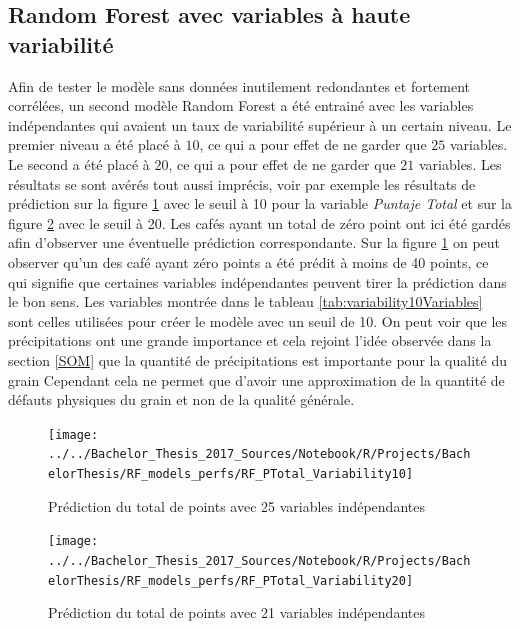 \subsection{Random Forest avec variables à haute variabilité}
Afin de tester le modèle sans données inutilement redondantes et fortement corrélées, un second modèle Random Forest a été entrainé avec les variables indépendantes qui avaient un taux de variabilité supérieur à un certain niveau. Le premier niveau a été placé à $10$, ce qui a pour effet de ne garder que $25$ variables. Le second a été placé à $20$, ce qui a pour effet de ne garder que $21$ variables. Les résultats se sont avérés tout aussi imprécis, voir par exemple les résultats de prédiction sur la figure \ref{fig:rfptotalvariability10} avec le seuil à 10 pour la variable \textit{Puntaje Total} et sur la figure \ref{fig:rfptotalvariability20} avec le seuil à 20. Les cafés ayant un total de zéro point ont ici été gardés afin d'observer une éventuelle prédiction correspondante. Sur la figure \ref{fig:rfptotalvariability10} on peut observer qu'un des café ayant zéro points a été prédit à moins de 40 points, ce qui signifie que certaines variables indépendantes peuvent tirer la prédiction dans le bon sens. Les variables montrée dans le tableau \ref{tab:variability10Variables} sont celles utilisées pour créer le modèle avec un seuil de 10. On peut voir que les précipitations ont une grande importance et cela rejoint l'idée observée dans la section \ref{SOM} que la quantité de précipitations est importante pour la qualité du grain Cependant cela ne permet que d'avoir une approximation de la quantité de défauts physiques du grain et non de la qualité générale. 

\begin{figure}[H]
	\centering
	\texttt{[image: ../../Bachelor\_Thesis\_2017\_Sources/Notebook/R/Projects/BachelorThesis/RF\_models\_perfs/RF\_PTotal\_Variability10]}
	\caption{Prédiction du total de points avec 25 variables indépendantes}
	\label{fig:rfptotalvariability10}
\end{figure}
\begin{figure}[H]
	\centering
	\texttt{[image: ../../Bachelor\_Thesis\_2017\_Sources/Notebook/R/Projects/BachelorThesis/RF\_models\_perfs/RF\_PTotal\_Variability20]}
	\caption{Prédiction du total de points avec 21 variables indépendantes}
	\label{fig:rfptotalvariability20}
\end{figure}





